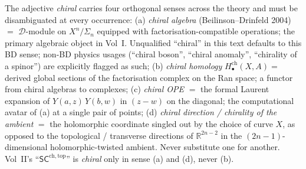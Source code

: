 \begin{description}[itemsep=4pt, leftmargin=2.0em, style=nextline]
\item[T7 (``chiral''--four distinct categorial levels, four
derivative compounds).]
%
The adjective \emph{chiral} carries four orthogonal senses across
the theory and must be disambiguated at every occurrence:
(a) \emph{chiral algebra} (Beilinson--Drinfeld 2004) $=$
$\mathscr{D}$-module on $X^n/\Sigma_n$ equipped with
factorisation-compatible operations; the primary algebraic object
in Vol~I. Unqualified ``chiral'' in this text defaults
to this BD sense; non-BD physics usages (``chiral boson'',
``chiral anomaly'', ``chirality of a spinor'') are explicitly
flagged as such;
(b) \emph{chiral homology} $H^{\mathrm{ch}}_\bullet(X, A) = $
derived global sections of the factorisation complex on the Ran
space; a functor from chiral algebras to complexes;
(c) \emph{chiral OPE} $=$ the formal Laurent expansion of
$Y(a, z)\, Y(b, w)$ in $(z-w)$ on the diagonal; the computational
avatar of (a) at a single pair of points;
(d) \emph{chiral direction / chirality of the ambient} $=$ the
holomorphic coordinate singled out by the choice of curve $X$, as
opposed to the topological / transverse directions of
$\mathbb{R}^{2n-2}$ in the $(2n-1)$-dimensional holomorphic-twisted
ambient. Never substitute one for another. Vol~II's
``$\mathsf{SC}^{\mathrm{ch,top}}$'' is \emph{chiral} only in sense (a)
and (d), never (b).


\end{description}
